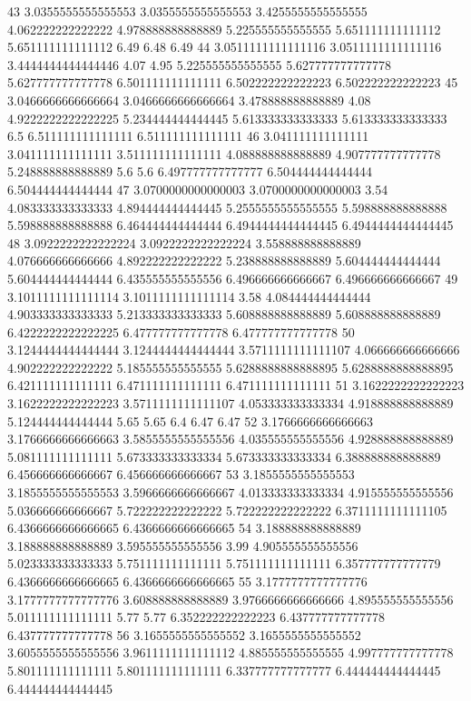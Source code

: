 43 3.0355555555555553 3.0355555555555553 3.4255555555555555 4.062222222222222 4.978888888888889 5.225555555555555 5.651111111111112 5.651111111111112 6.49 6.48 6.49
44 3.0511111111111116 3.0511111111111116 3.4444444444444446 4.07 4.95 5.225555555555555 5.627777777777778 5.627777777777778 6.501111111111111 6.502222222222223 6.502222222222223
45 3.0466666666666664 3.0466666666666664 3.478888888888889 4.08 4.9222222222222225 5.234444444444445 5.613333333333333 5.613333333333333 6.5 6.511111111111111 6.511111111111111
46 3.041111111111111 3.041111111111111 3.511111111111111 4.088888888888889 4.907777777777778 5.248888888888889 5.6 5.6 6.497777777777777 6.504444444444444 6.504444444444444
47 3.0700000000000003 3.0700000000000003 3.54 4.083333333333333 4.894444444444445 5.2555555555555555 5.598888888888888 5.598888888888888 6.464444444444444 6.4944444444444445 6.4944444444444445
48 3.0922222222222224 3.0922222222222224 3.558888888888889 4.076666666666666 4.892222222222222 5.238888888888889 5.604444444444444 5.604444444444444 6.435555555555556 6.496666666666667 6.496666666666667
49 3.1011111111111114 3.1011111111111114 3.58 4.084444444444444 4.903333333333333 5.213333333333333 5.608888888888889 5.608888888888889 6.4222222222222225 6.477777777777778 6.477777777777778
50 3.1244444444444444 3.1244444444444444 3.5711111111111107 4.066666666666666 4.902222222222222 5.185555555555555 5.6288888888888895 5.6288888888888895 6.421111111111111 6.471111111111111 6.471111111111111
51 3.1622222222222223 3.1622222222222223 3.5711111111111107 4.053333333333334 4.918888888888889 5.124444444444444 5.65 5.65 6.4 6.47 6.47
52 3.1766666666666663 3.1766666666666663 3.5855555555555556 4.035555555555556 4.928888888888889 5.081111111111111 5.673333333333334 5.673333333333334 6.388888888888889 6.456666666666667 6.456666666666667
53 3.1855555555555553 3.1855555555555553 3.5966666666666667 4.013333333333334 4.915555555555556 5.036666666666667 5.722222222222222 5.722222222222222 6.3711111111111105 6.4366666666666665 6.4366666666666665
54 3.188888888888889 3.188888888888889 3.595555555555556 3.99 4.905555555555556 5.023333333333333 5.751111111111111 5.751111111111111 6.357777777777779 6.4366666666666665 6.4366666666666665
55 3.1777777777777776 3.1777777777777776 3.608888888888889 3.9766666666666666 4.895555555555556 5.011111111111111 5.77 5.77 6.352222222222223 6.437777777777778 6.437777777777778
56 3.1655555555555552 3.1655555555555552 3.6055555555555556 3.9611111111111112 4.885555555555555 4.997777777777778 5.801111111111111 5.801111111111111 6.337777777777777 6.444444444444445 6.444444444444445
